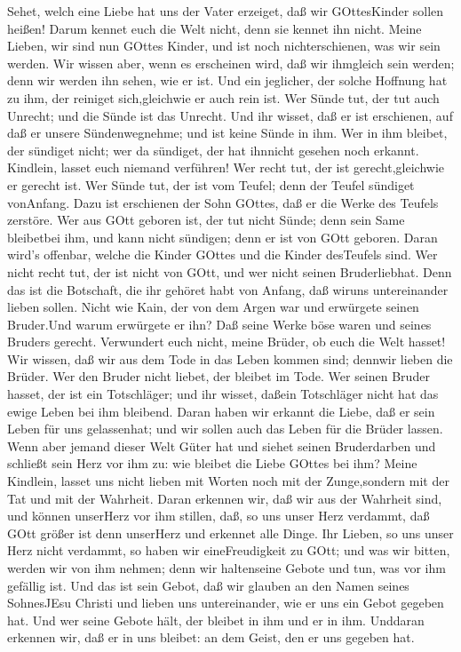 Sehet, welch eine Liebe hat uns der Vater erzeiget, daß wir
GOttesKinder sollen heißen! Darum kennet euch die Welt nicht, denn sie
kennet ihn nicht.  Meine Lieben, wir sind nun GOttes Kinder,
und ist noch nichterschienen, was wir sein werden. Wir wissen aber, wenn
es erscheinen wird, daß wir ihmgleich sein werden; denn wir werden ihn
sehen, wie er ist.  Und ein jeglicher, der solche Hoffnung
hat zu ihm, der reiniget sich,gleichwie er auch rein ist. 
Wer Sünde tut, der tut auch Unrecht; und die Sünde ist das Unrecht.
 Und ihr wisset, daß er ist erschienen, auf daß er unsere
Sündenwegnehme; und ist keine Sünde in ihm.  Wer in ihm
bleibet, der sündiget nicht; wer da sündiget, der hat ihnnicht gesehen
noch erkannt.  Kindlein, lasset euch niemand verführen! Wer
recht tut, der ist gerecht,gleichwie er gerecht ist.  Wer
Sünde tut, der ist vom Teufel; denn der Teufel sündiget vonAnfang. Dazu
ist erschienen der Sohn GOttes, daß er die Werke des Teufels zerstöre.
 Wer aus GOtt geboren ist, der tut nicht Sünde; denn sein
Same bleibetbei ihm, und kann nicht sündigen; denn er ist von GOtt
geboren.  Daran wird's offenbar, welche die Kinder GOttes
und die Kinder desTeufels sind. Wer nicht recht tut, der ist nicht von
GOtt, und wer nicht seinen Bruderliebhat.  Denn das ist die
Botschaft, die ihr gehöret habt von Anfang, daß wiruns untereinander
lieben sollen.  Nicht wie Kain, der von dem Argen war und
erwürgete seinen Bruder.Und warum erwürgete er ihn? Daß seine Werke böse
waren und seines Bruders gerecht.  Verwundert euch nicht,
meine Brüder, ob euch die Welt hasset!  Wir wissen, daß wir
aus dem Tode in das Leben kommen sind; dennwir lieben die Brüder. Wer
den Bruder nicht liebet, der bleibet im Tode.  Wer seinen
Bruder hasset, der ist ein Totschläger; und ihr wisset, daßein
Totschläger nicht hat das ewige Leben bei ihm bleibend. 
Daran haben wir erkannt die Liebe, daß er sein Leben für uns
gelassenhat; und wir sollen auch das Leben für die Brüder lassen.
 Wenn aber jemand dieser Welt Güter hat und siehet seinen
Bruderdarben und schließt sein Herz vor ihm zu: wie bleibet die Liebe
GOttes bei ihm?  Meine Kindlein, lasset uns nicht lieben
mit Worten noch mit der Zunge,sondern mit der Tat und mit der Wahrheit.
 Daran erkennen wir, daß wir aus der Wahrheit sind, und
können unserHerz vor ihm stillen,  daß, so uns unser Herz
verdammt, daß GOtt größer ist denn unserHerz und erkennet alle Dinge.
 Ihr Lieben, so uns unser Herz nicht verdammt, so haben wir
eineFreudigkeit zu GOtt;  und was wir bitten, werden wir
von ihm nehmen; denn wir haltenseine Gebote und tun, was vor ihm
gefällig ist.  Und das ist sein Gebot, daß wir glauben an
den Namen seines SohnesJEsu Christi und lieben uns untereinander, wie er
uns ein Gebot gegeben hat.  Und wer seine Gebote hält, der
bleibet in ihm und er in ihm. Unddaran erkennen wir, daß er in uns
bleibet: an dem Geist, den er uns gegeben hat.

